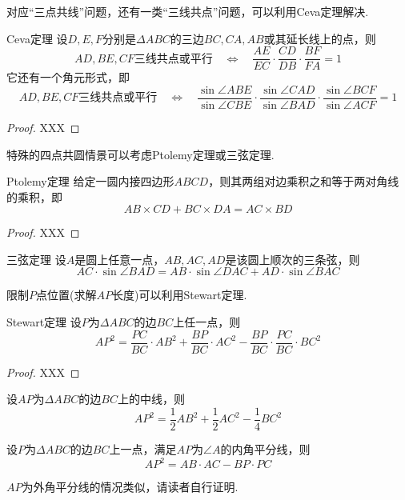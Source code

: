 \documentclass[lang=cn, zihao=5]{elegantbook}
\begin{document}
对应“三点共线”问题，还有一类“三线共点”问题，可以利用Ceva定理解决.

\begin{theorem}{Ceva定理}
    设$D,E,F$分别是$\Delta ABC$的三边$BC,CA,AB$或其延长线上的点，则$$AD,BE,CF \text{三线共点或平行} \quad \Longleftrightarrow \quad \frac{AE}{EC} \cdot \frac{CD}{DB} \cdot \frac{BF}{FA} = 1$$
    它还有一个角元形式，即$$AD,BE,CF \text{三线共点或平行} \quad \Longleftrightarrow \quad \frac{\sin \angle ABE}{\sin \angle CBE} \cdot \frac{\sin \angle CAD}{\sin \angle BAD} \cdot \frac{\sin \angle BCF}{\sin \angle ACF} = 1$$
\end{theorem}
\begin{proof}
    XXX
\end{proof}

特殊的四点共圆情景可以考虑Ptolemy定理或三弦定理.

\begin{theorem}{Ptolemy定理}
    给定一圆内接四边形$ABCD$，则其两组对边乘积之和等于两对角线的乘积，即$$AB \times CD + BC \times DA = AC \times BD$$
\end{theorem}
\begin{proof}
    XXX
\end{proof}

\begin{corollary}{三弦定理}
    设$A$是圆上任意一点，$AB,AC,AD$是该圆上顺次的三条弦，则$$AC \cdot \sin \angle BAD = AB \cdot \sin \angle DAC + AD \cdot \sin \angle BAC$$
\end{corollary}

限制$P$点位置(求解$AP$长度)可以利用Stewart定理.

\begin{theorem}{Stewart定理}
    设$P$为$\Delta ABC$的边$BC$上任一点，则$$AP^2=\frac{PC}{BC} \cdot AB^2 + \frac{BP}{BC} \cdot AC^2 - \frac{BP}{BC} \cdot \frac{PC}{BC} \cdot BC^2$$
\end{theorem}
\begin{proof}
    XXX
\end{proof}

\begin{corollary}
    设$AP$为$\Delta ABC$的边$BC$上的中线，则$$AP^2 = \frac{1}{2} AB^2 + \frac{1}{2} AC^2 - \frac{1}{4}BC^2$$
\end{corollary}
    
\begin{corollary}
    设$P$为$\Delta ABC$的边$BC$上一点，满足$AP$为$\angle A$的内角平分线，则$$AP^2 = AB \cdot AC - BP \cdot PC$$
\end{corollary}
\begin{remark}
    $AP$为外角平分线的情况类似，请读者自行证明.
\end{remark}
\end{document}
